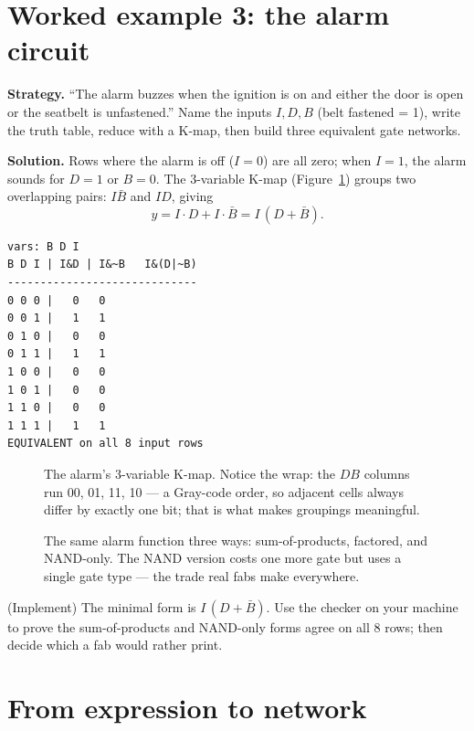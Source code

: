 \section{Worked example 3: the alarm circuit}
\label{sec:we-alarm}

\textbf{Strategy.} ``The alarm buzzes when the ignition is on and either
the door is open or the seatbelt is unfastened.'' Name the inputs
$I, D, B$ (belt fastened = 1), write the truth table, reduce with a
K-map, then build three equivalent gate networks.

\textbf{Solution.} Rows where the alarm is off ($I=0$) are all zero;
when $I=1$, the alarm sounds for $D=1$ or $B=0$. The 3-variable K-map
(Figure~\ref{fig:kmap3}) groups two overlapping pairs:
$I\bar B$ and $ID$, giving
\[
y = I\cdot D + I\cdot\bar B = I\,(D+\bar B).
\]

\begin{lstlisting}[caption={Checker confirms the factored form
(verbatim).},abovecaptionskip=0pt]
vars: B D I
B D I | I&D | I&~B   I&(D|~B)
-----------------------------
0 0 0 |   0   0
0 0 1 |   1   1
0 1 0 |   0   0
0 1 1 |   1   1
1 0 0 |   0   0
1 0 1 |   0   0
1 1 0 |   0   0
1 1 1 |   1   1
EQUIVALENT on all 8 input rows
\end{lstlisting}

\begin{figure}[htbp]
\centering

\caption{The alarm's 3-variable K-map. Notice the wrap: the $DB$ columns
run 00, 01, 11, 10 — a Gray-code order, so adjacent cells always differ
by exactly one bit; that is what makes groupings meaningful.}
\label{fig:kmap3}
\end{figure}

\begin{figure}[htbp]
\centering

\caption{The same alarm function three ways: sum-of-products, factored,
and NAND-only. The NAND version costs one more gate but uses a single
gate type — the trade real fabs make everywhere.}
\label{fig:threeways}
\end{figure}

\begin{exercise}[hard]
(Implement) The minimal form is $I\,(D+\bar B)$. Use the checker on
your machine to prove the sum-of-products and NAND-only forms agree on
all 8 rows; then decide which a fab would rather print.
\end{exercise}

\section{From expression to network}
\label{sec:pipeline}

